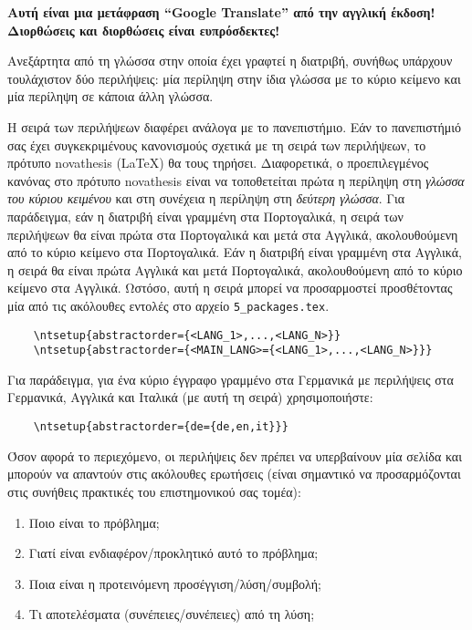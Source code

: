 
%

\textbf{Αυτή είναι μια μετάφραση “Google Translate” από την αγγλική έκδοση! Διορθώσεις και διορθώσεις είναι ευπρόσδεκτες!}

Ανεξάρτητα από τη γλώσσα στην οποία έχει γραφτεί η διατριβή, συνήθως υπάρχουν τουλάχιστον δύο περιλήψεις: μία περίληψη στην ίδια γλώσσα με το κύριο κείμενο και μία περίληψη σε κάποια άλλη γλώσσα.

Η σειρά των περιλήψεων διαφέρει ανάλογα με το πανεπιστήμιο.  
Εάν το πανεπιστήμιό σας έχει συγκεκριμένους κανονισμούς σχετικά με τη σειρά των περιλήψεων, το πρότυπο \gls{novathesis} (\LaTeX) θα τους τηρήσει.  
Διαφορετικά, ο προεπιλεγμένος κανόνας στο πρότυπο \gls{novathesis} είναι να τοποθετείται πρώτα η περίληψη στη \emph{γλώσσα του κύριου κειμένου} και στη συνέχεια η περίληψη στη \emph{δεύτερη γλώσσα}.  
Για παράδειγμα, εάν η διατριβή είναι γραμμένη στα Πορτογαλικά, η σειρά των περιλήψεων θα είναι πρώτα στα Πορτογαλικά και μετά στα Αγγλικά, ακολουθούμενη από το κύριο κείμενο στα Πορτογαλικά.  
Εάν η διατριβή είναι γραμμένη στα Αγγλικά, η σειρά θα είναι πρώτα Αγγλικά και μετά Πορτογαλικά, ακολουθούμενη από το κύριο κείμενο στα Αγγλικά.
%
Ωστόσο, αυτή η σειρά μπορεί να προσαρμοστεί προσθέτοντας μία από τις ακόλουθες εντολές στο αρχείο \verb+5_packages.tex+.

\begin{verbatim}
    \ntsetup{abstractorder={<LANG_1>,...,<LANG_N>}}
    \ntsetup{abstractorder={<MAIN_LANG>={<LANG_1>,...,<LANG_N>}}}
\end{verbatim}

Για παράδειγμα, για ένα κύριο έγγραφο γραμμένο στα Γερμανικά με περιλήψεις στα Γερμανικά, Αγγλικά και Ιταλικά (με αυτή τη σειρά) χρησιμοποιήστε:
\begin{verbatim}
    \ntsetup{abstractorder={de={de,en,it}}}
\end{verbatim}

Όσον αφορά το περιεχόμενο, οι περιλήψεις δεν πρέπει να υπερβαίνουν μία σελίδα και μπορούν να απαντούν στις ακόλουθες ερωτήσεις (είναι σημαντικό να προσαρμόζονται στις συνήθεις πρακτικές του επιστημονικού σας τομέα):

\begin{enumerate}
  \item Ποιο είναι το πρόβλημα;
  \item Γιατί είναι ενδιαφέρον/προκλητικό αυτό το πρόβλημα;
  \item Ποια είναι η προτεινόμενη προσέγγιση/λύση/συμβολή;
  \item Τι αποτελέσματα (συνέπειες/συνέπειες) από τη λύση;
\end{enumerate}


